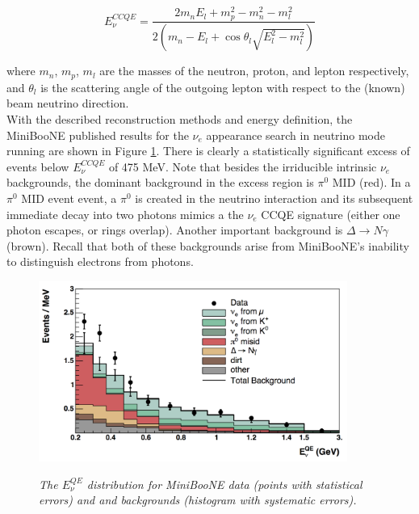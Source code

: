 \begin{equation}\label{MB_CCQE_formula}
E_\nu^{CCQE} = \frac{2m_nE_l+m_p^2-m_n^2-m_l^2}{2(m_n-E_l+\cos\theta_l\sqrt{E_l^2-m_l^2})}
\end{equation}

where $m_n$, $m_p$, $m_l$ are the masses of the neutron, proton, and lepton respectively, and $\theta_l$ is the scattering angle of the outgoing lepton with respect to the (known) beam neutrino direction.\\

With the described reconstruction methods and energy definition, the MiniBooNE published results \cite{MBLEEPaper} for the $\nu_e$ appearance search in neutrino mode running are shown in Figure \ref{MB_published_stackedhisto_fig}. There is clearly a statistically significant excess of events below $E_\nu^{CCQE}$ of 475 MeV. Note that besides the irriducible intrinsic $\nu_e$ backgrounds, the dominant background in the excess region is $\pi^0$ MID (red). In a $\pi^0$ MID event event, a $\pi^0$ is created in the neutrino interaction and its subsequent immediate decay into two photons mimics a the $\nu_e$ CCQE signature (either one photon escapes, or rings overlap). Another important background is $\Delta\rightarrow N\gamma$ (brown). Recall that both of these backgrounds arise from MiniBooNE's inability to distinguish electrons from photons.\\


\begin{figure}[ht!]
\centering
	\includegraphics[width=0.9\textwidth]{Figures/MB_published_stackedhisto.png} \\
\caption{\textit{The $E_\nu^{QE}$ distribution for MiniBooNE data (points with statistical errors) and and backgrounds (histogram with systematic errors).}}\label{MB_published_stackedhisto_fig}
\end{figure}

